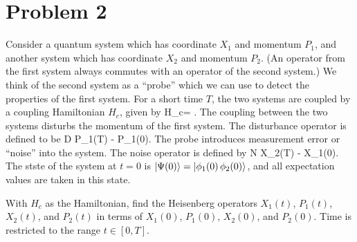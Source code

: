 \newcommand{\Xq}{X_1}
\newcommand{\Pq}{P_1}
\newcommand{\Xw}{X_2}
\newcommand{\Pw}{P_2}
\newcommand{\Hc}{H_c}

\newcommand{\Xqo}{\Xq(0)}
\newcommand{\Pqo}{\Pq(0)}
\newcommand{\Xwo}{\Xw(0)}
\newcommand{\Pwo}{\Pw(0)}

\newcommand{\Xqt}{\Xq(t)}
\newcommand{\Pqt}{\Pq(t)}
\newcommand{\Xwt}{\Xw(t)}
\newcommand{\Pwt}{\Pw(t)}

\newcommand{\XqT}{\Xq(T)}
\newcommand{\PqT}{\Pq(T)}
\newcommand{\XwT}{\Xw(T)}
\newcommand{\PwT}{\Pw(T)}

\newcommand{\kPsio}{\ket{\Psi(0)}}
\newcommand{\phio}{\phi_1(0) \,\phi_2(0)}
\newcommand{\kphiqo}{\ket{\phi_1(0)}}
\newcommand{\kphiwo}{\ket{\phi_2(0)}}

\newcommand{\kphio}{\ket{\phio}}


\newcommand{\Ot}{O(t)}
\newcommand{\Udt}{U^\dagger(t)}

\section{Problem 2}
\begin{statement}
	Consider a quantum system which has coordinate $\Xq$ and momentum $\Pq$, and another system which has coordinate $\Xw$ and momentum $\Pw$.  (An operator from the first system always commutes with an operator of the second system.)  We think of the second system as a ``probe'' which we can use to detect the properties of the first system.  For a short time $T$, the two systems are coupled by a coupling Hamiltonian $\Hc$, given by
	\beq
		\Hc = \frac{\Xq \Pw}{T}.
	\eeq
	The coupling between the two systems disturbs the momentum of the first system.  The disturbance operator is defined to be
	\beqn \label{dist}
		D \equiv \Pq(T) - \Pqo.
	\eeqn
	The probe introduces measurement error or ``noise'' into the system.  The noise operator is defined by
	\beq
		N \equiv \Xw(T) - \Xqo.
	\eeq
	The stste of the system at $t = 0$ is $\kPsio = \kphio$, and all expectation values are taken in this state.
\end{statement}

\begin{problem}
	With $\Hc$ as the Hamiltonian, find the Heisenberg operators $\Xqt$, $\Pqt$, $\Xwt$, and $\Pwt$ in terms of $\Xqo$, $\Pqo$, $\Xwo$, and $\Pwo$.  Time is restricted to the range $t \in [0, T]$.
\end{problem}

